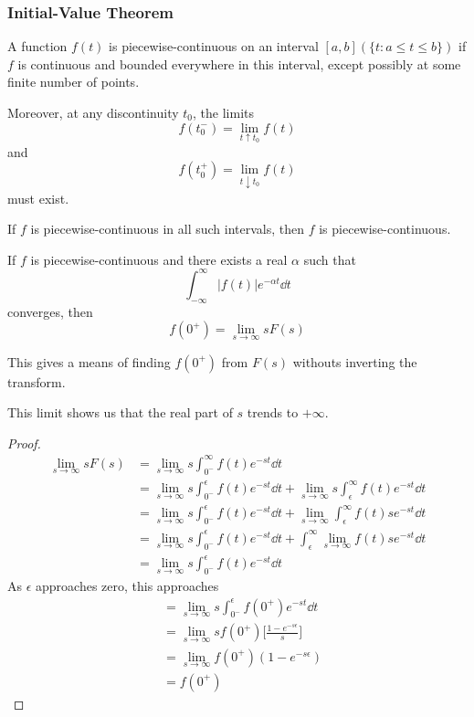 \documentclass[12pt]{article}
\begin{document}
\subsubsection{Initial-Value Theorem}

\begin{definition}
A function $f(t)$ is piecewise-continuous on an interval $[a,b] (\{t: a \leq t \leq b \})$ if $f$ is continuous and bounded everywhere in this interval, except possibly at some finite number of points.

Moreover, at any discontinuity $t_0$, the limits \[ f(t_0^-) = \lim_{t\uparrow t_0} f(t) \] and \[ f(t_0^+) = \lim_{t\downarrow t_0} f(t) \] must exist.

If $f$ is piecewise-continuous in all such intervals, then $f$ is piecewise-continuous.
\end{definition}

\begin{theorem}
If $f$ is piecewise-continuous and there exists a real $\alpha$ such that \[ \int_{-\infty}^\infty |f(t)| e^{-\alpha t} \dd t\] converges, then \[ f(0^+) = \lim_{s\to\infty} sF(s) \]

This gives a means of finding $f(0^+)$ from $F(s)$ withouts inverting the transform.
\end{theorem}

This limit shows us that the real part of $s$ trends to $+\infty$.

\begin{proof}
\begin{align*}
\lim_{s\to\infty} sF(s) &= \lim_{s\to\infty} s\int_{0^-}^\infty f(t) e^{-st} \dd t\\
&= \lim_{s\to\infty} s\int_{0^-}^\epsilon f(t) e^{-st} \dd t + \lim_{s\to\infty} s\int_\epsilon^\infty f(t) e^{-st} \dd t\\
&= \lim_{s\to\infty} s\int_{0^-}^\epsilon f(t) e^{-st} \dd t + \lim_{s\to\infty} \int_\epsilon^\infty f(t) se^{-st} \dd t\\
&= \lim_{s\to\infty} s\int_{0^-}^\epsilon f(t) e^{-st} \dd t + \int_\epsilon^\infty \lim_{s\to\infty} f(t) se^{-st} \dd t\\
&= \lim_{s\to\infty} s\int_{0^-}^\epsilon f(t) e^{-st} \dd t
\end{align*}
As $\epsilon$ approaches zero, this approaches
\begin{align*}
&= \lim_{s\to\infty} s\int_{0^-}^\epsilon f(0^+) e^{-st} \dd t\\
&= \lim_{s\to\infty} s f(0^+) \bigg[ \frac{1-e^{-s\epsilon}}{s} \bigg]\\
&= \lim_{s\to\infty} f(0^+) (1-e^{-s\epsilon})\\
&= f(0^+)
\end{align*}
\end{proof}
\end{document}
